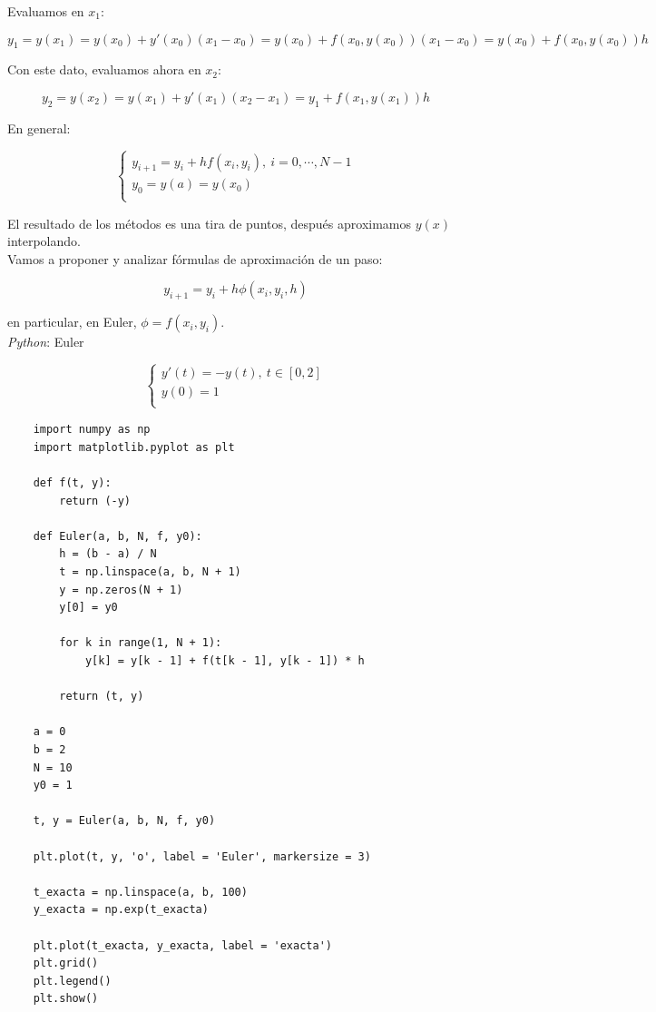 Evaluamos en $x_{1}$:

$$y_{1} = y(x_{1}) = y(x_{0}) + y'(x_{0})(x_{1} - x_{0}) = y(x_{0}) + f(x_{0}, y(x_{0}))(x_{1} - x_{0}) = y(x_{0}) + f(x_{0}, y(x_{0}))h$$

Con este dato, evaluamos ahora en $x_{2}$:

$$y_{2} = y(x_{2}) = y(x_{1}) + y'(x_{1})(x_{2} - x_{1}) = y_{1} + f(x_{1}, y(x_{1}))h$$

En general:

$$ 
	\begin{cases}
        y_{i + 1} = y_{i} + hf(x_{i}, y_{i}),\ i = 0, \cdots, N - 1\\
        y_{0} = y(a) = y(x_{0})\\
    \end{cases}
$$

El resultado de los m\'etodos es una tira de puntos, despu\'es aproximamos $y(x)$ interpolando.\\

Vamos a proponer y analizar f\'ormulas de aproximaci\'on de un paso:

$$y_{i + 1} = y_{i} + h\phi(x_{i}, y_{i}, h)$$

en particular, en Euler, $\phi = f(x_{i}, y_{i})$.\\

\textit{Python}: Euler

$$ 
	\begin{cases}
        y'(t) = -y(t),\ t \in [0, 2]\\
        y(0) = 1\\
    \end{cases}
$$

\begin{verbatim}
	import numpy as np
	import matplotlib.pyplot as plt
	
	def f(t, y):
	    return (-y)
		
	def Euler(a, b, N, f, y0):
	    h = (b - a) / N
	    t = np.linspace(a, b, N + 1)
	    y = np.zeros(N + 1)
	    y[0] = y0
		
	    for k in range(1, N + 1):
	        y[k] = y[k - 1] + f(t[k - 1], y[k - 1]) * h
		
	    return (t, y)
		
	a = 0
	b = 2
	N = 10
	y0 = 1
	
	t, y = Euler(a, b, N, f, y0)
	
	plt.plot(t, y, 'o', label = 'Euler', markersize = 3)
	
	t_exacta = np.linspace(a, b, 100)
	y_exacta = np.exp(t_exacta)
	
	plt.plot(t_exacta, y_exacta, label = 'exacta')
	plt.grid()
	plt.legend()
	plt.show()
\end{verbatim}

